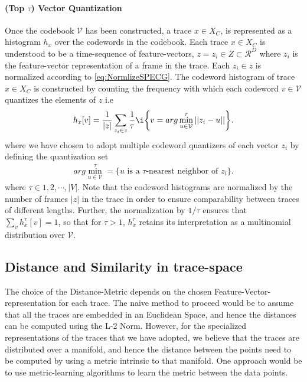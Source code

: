 \documentclass[10pt]{article}
\begin{document}
\paragraph{(Top $\tau$) Vector Quantization}
Once the codebook $\mathcal{V}$ has been constructed, a trace $x \in X_C$, is represented as a histogram $h_x$ over the codewords in the codebook. Each trace $x \in X_C$ is understood to be a time-sequence of feature-vectors, $ z = {z_i} \in Z \subset \mathcal{R}^D$ where $z_i$ is the feature-vector representation of a frame in the trace. Each $ z_i \in z$ is normalized according to \eqref{eq:NormlizeSPECG}. The codeword histogram of trace $x \in X_C$ is constructed by counting the frequency with which each codeword $v \in \mathcal{V}$ quantizes the elements of $z$ i.e
\begin{align}
h_x[v] = \frac{1}{|z|} \sum_{z_i \in z} \frac{1}{\tau}\i\bigg\lbrace v = arg\min_{u \in \mathcal{V}}^{\tau}||z_i - u|| \bigg\rbrace. \label{eq:wc_Hist_Defn}
\end{align}
where we have chosen to adopt multiple codeword quantizers of each vector $z_i$ by defining the quantization set
\begin{align}
arg\min_{u \in \mathcal{V}}^{\tau} = \big\lbrace u \text{ is a } \tau \text{-nearest neighbor of }z_i \big\rbrace. \label{eq:TauQuantize}
\end{align}
where $\tau \in {1,2,\cdots, |V|}.$
Note that the codeword histograms are normalized by the number of frames $|z|$ in the trace in order to ensure comparability between traces of different lengths. Further, the normalization by $1/\tau$ ensures that $\sum_v h_x^{\tau}[v] = 1$, so that for $\tau > 1$, $h_x^{\tau}$ retains its interpretation as a multinomial distribution over $\mathcal{V}$.


\subsection{Distance and Similarity in trace-space}

The choice of the Distance-Metric depends on the chosen Feature-Vector-representation for each trace. The naive method to proceed would be to assume that all the traces are embedded in an Euclidean Space, and hence the distances can be computed using the L-2 Norm. However, for the specialized representations of the traces that we have adopted, we believe that the traces are distributed over a manifold, and hence the distance between the points need to be computed by using a metric intrinsic to that manifold. One approach would be to use metric-learning algorithms to learn the metric between the data points. 
\end{document}

